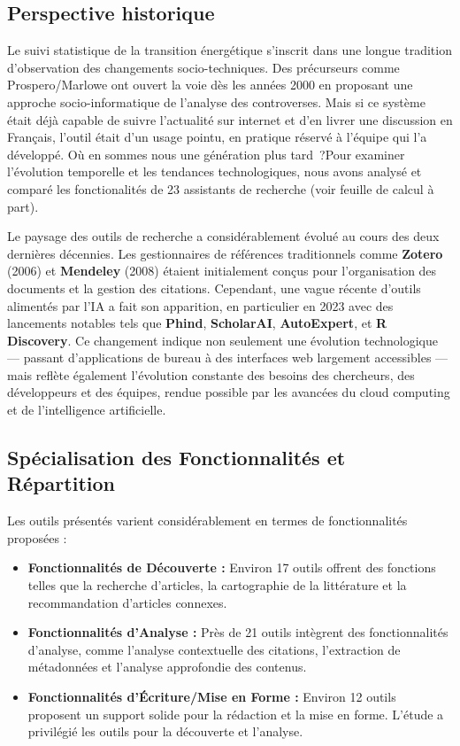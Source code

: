 \documentclass[a4paper,11pt]{report}
\providecommand{\tightlist}{\setlength{\itemsep}{0pt}\setlength{\parskip}{0pt}}
\begin{document}
\subsection{Perspective historique}\label{perspective-historique}

Le suivi statistique de la transition énergétique s'inscrit dans une longue tradition d'observation des changements socio-techniques. Des précurseurs comme Prospero/Marlowe \citep{4I2B7RMB} ont ouvert la voie dès les années 2000 en proposant une approche socio-informatique de l'analyse des controverses. Mais si ce système était déjà capable de suivre l'actualité sur internet et d'en livrer une discussion en Français, l'outil était d'un usage pointu, en pratique réservé à l'équipe qui l'a développé. Où en sommes nous une génération plus tard~?Pour examiner l'évolution temporelle et les tendances technologiques, nous avons analysé et comparé les fonctionalités de 23 assistants de recherche (voir feuille de calcul à part).

Le paysage des outils de recherche a considérablement évolué au cours des deux dernières décennies. Les gestionnaires de références traditionnels comme \textbf{Zotero} (2006) et \textbf{Mendeley} (2008) étaient initialement conçus pour l'organisation des documents et la gestion des citations. Cependant, une vague récente d'outils alimentés par l'IA a fait son apparition, en particulier en 2023 avec des lancements notables tels que \textbf{Phind}, \textbf{ScholarAI}, \textbf{AutoExpert}, et \textbf{R Discovery}. Ce changement indique non seulement une évolution technologique --- passant d'applications de bureau à des interfaces web largement accessibles --- mais reflète également l'évolution constante des besoins des chercheurs, des développeurs et des équipes, rendue possible par les avancées du cloud computing et de l'intelligence artificielle.

\subsection{Spécialisation des Fonctionnalités et Répartition}\label{spuxe9cialisation-des-fonctionnalituxe9s-et-ruxe9partition}

Les outils présentés varient considérablement en termes de fonctionnalités proposées :

\begin{itemize}
\tightlist
\item
  \textbf{Fonctionnalités de Découverte :} Environ 17 outils offrent des fonctions telles que la recherche d'articles, la cartographie de la littérature et la recommandation d'articles connexes.
\item
  \textbf{Fonctionnalités d'Analyse :} Près de 21 outils intègrent des fonctionnalités d'analyse, comme l'analyse contextuelle des citations, l'extraction de métadonnées et l'analyse approfondie des contenus.
\item
  \textbf{Fonctionnalités d'Écriture/Mise en Forme :} Environ 12 outils proposent un support solide pour la rédaction et la mise en forme. L'étude a privilégié les outils pour la découverte et l'analyse.
\end{itemize}
\end{document}
